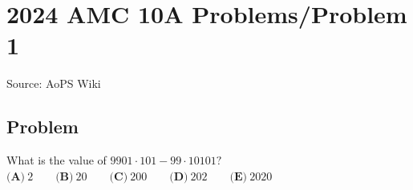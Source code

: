 \documentclass[12pt]{article}
\begin{document}
\section*{{2024 AMC 10A Problems/Problem 1}}
Source: AoPS Wiki

\subsection*{Problem}
What is the value of $9901\cdot101-99\cdot10101?$ $\textbf{(A)}~2\qquad\textbf{(B)}~20\qquad\textbf{(C)}~200\qquad\textbf{(D)}~202\qquad\textbf{(E)}~2020$
\end{document}
